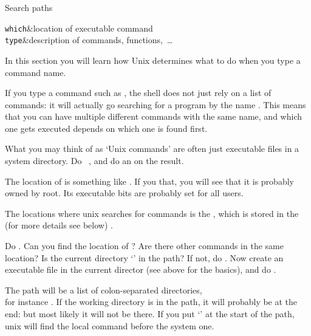  {Search paths}
\label{sec:PATH}

\begin{stufflearned}
  \lstinline+which+&location of executable command\\
  \lstinline+type+&description of commands, functions,~\ldots\\
\end{stufflearned}

\begin{purpose}
  In this section you will learn how Unix determines what to do when
  you type a command name.
\end{purpose}

If you type a command such as , the shell does not just rely on
a list of commands: it will actually go searching for a program by the
name . This means that you can have multiple different commands
with the same name, and which one gets executed depends on which one
is found first.

\begin{exercise}
  What you may think of as `Unix commands' are often just executable
  files in a system directory. Do ~, and do
  an  on the result.
\end{exercise}
\begin{outcome}
  The location of  is something like . If you
     that, you will see that it is probably owned by root. Its
    executable bits are probably set for all users.
\end{outcome}

The locations where unix searches for commands is the
,
which is stored in the  (for more
details see below) .

\begin{exercise}
  Do . Can you find the location of ?  Are there
  other commands in the same location? Is the current directory
  `' in the path? If not, do . Now
  create an executable file  in the current director (see above
  for the basics), and do .
\end{exercise}
\begin{outcome}
  The path will be a list of colon-separated directories,\\ for
  instance . If the working
  directory is in the path, it will probably be at the end:
    but most likely it will not be there. If you
  put `' at the start of the path, unix will find the local
   command before the system one.
\end{outcome}

